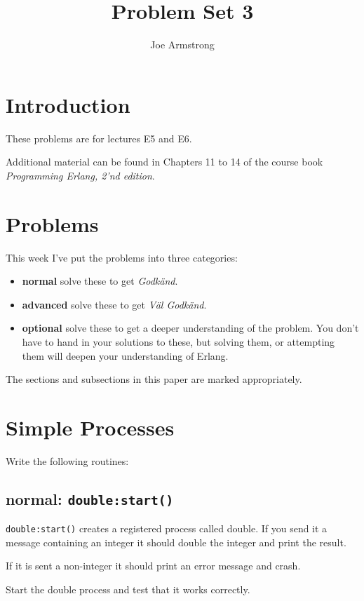 \documentclass[12pt]{hitec}
\title{Problem Set 3}
\author{Joe Armstrong}
\begin{document}
\maketitle

\tableofcontents

\section{Introduction}
These problems are for lectures E5 and E6.

Additional material can be found in Chapters 11 to 14 of the course book
{\sl Programming Erlang, 2'nd edition}.

\section{Problems}

This week I've put the problems into three categories:

\begin{itemize}
\item {\bf normal} solve these to get {\sl Godk\"{a}nd}.
\item {\bf advanced} solve these to get {\sl V\"{a}l Godk\"{a}nd}.
\item {\bf optional} solve these to get a deeper understanding of the problem. You don't
have to hand in your solutions to these, but solving them, or attempting them will
deepen your understanding of Erlang.
\end{itemize}

The sections and subsections in this paper are marked appropriately.

\section{Simple Processes}


Write the following routines:

\subsection{normal: \texttt{double:start()}}

\verb+double:start()+ creates a registered process called double.
If you send it a message containing an integer it should
double the integer and print the result.

If it is sent a non-integer it should print an error message
and crash.

Start the double process and test that it works correctly.
\end{document}
